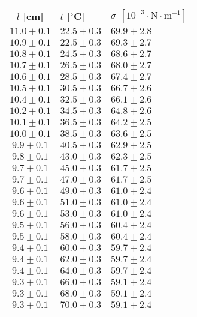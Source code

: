 \documentclass[a4paper]{article}
\begin{document}
\begin{center}
    \label{tab:title}
    \begin{tabular}{ | c | l |   p{3cm} |} \hline
    $l$ [cm] & $t$ [$^\circ$C] & $\sigma$ $\mathrm{[ 10^{-3} \cdot N \cdot m^{-1}]}$  \\ \hline
    $11.0\pm0.1$ & $22.5\pm0.3$ & $69.9\pm2.8$ \\ \hline
    $10.9\pm0.1$ & $22.5\pm0.3$ & $69.3\pm2.7$ \\ \hline
    $10.8\pm0.1$ & $24.5\pm0.3$ & $68.6\pm2.7$ \\ \hline
    $10.7\pm0.1$ & $26.5\pm0.3$ & $68.0\pm2.7$ \\ \hline
    $10.6\pm0.1$ & $28.5\pm0.3$ & $67.4\pm2.7$ \\ \hline
    $10.5\pm0.1$ & $30.5\pm0.3$ & $66.7\pm2.6$ \\ \hline
    $10.4\pm0.1$ & $32.5\pm0.3$ & $66.1\pm2.6$ \\ \hline
    $10.2\pm0.1$ & $34.5\pm0.3$ & $64.8\pm2.6$ \\ \hline
    $10.1\pm0.1$ & $36.5\pm0.3$ & $64.2\pm2.5$ \\ \hline
    $10.0\pm0.1$ & $38.5\pm0.3$ & $63.6\pm2.5$ \\ \hline
    $9.9\pm0.1$  & $40.5\pm0.3$ & $62.9\pm2.5$ \\ \hline
    $9.8\pm0.1$  & $43.0\pm0.3$ & $62.3\pm2.5$ \\ \hline
    $9.7\pm0.1$  & $45.0\pm0.3$ & $61.7\pm2.5$ \\ \hline
    $9.7\pm0.1$  & $47.0\pm0.3$ & $61.7\pm2.5$ \\ \hline
    $9.6\pm0.1$  & $49.0\pm0.3$ & $61.0\pm2.4$ \\ \hline
    $9.6\pm0.1$  & $51.0\pm0.3$ & $61.0\pm2.4$ \\ \hline
    $9.6\pm0.1$  & $53.0\pm0.3$ & $61.0\pm2.4$ \\ \hline
    $9.5\pm0.1$  & $56.0\pm0.3$ & $60.4\pm2.4$ \\ \hline
    $9.5\pm0.1$  & $58.0\pm0.3$ & $60.4\pm2.4$ \\ \hline
    $9.4\pm0.1$  & $60.0\pm0.3$ & $59.7\pm2.4$ \\ \hline
    $9.4\pm0.1$  & $62.0\pm0.3$ & $59.7\pm2.4$ \\ \hline
    $9.4\pm0.1$  & $64.0\pm0.3$ & $59.7\pm2.4$ \\ \hline
    $9.3\pm0.1$  & $66.0\pm0.3$ & $59.1\pm2.4$ \\ \hline
    $9.3\pm0.1$  & $68.0\pm0.3$ & $59.1\pm2.4$ \\ \hline
    $9.3\pm0.1$  & $70.0\pm0.3$ & $59.1\pm2.4$ \\ \hline
    \end{tabular}
\end{center}
\end{document}
